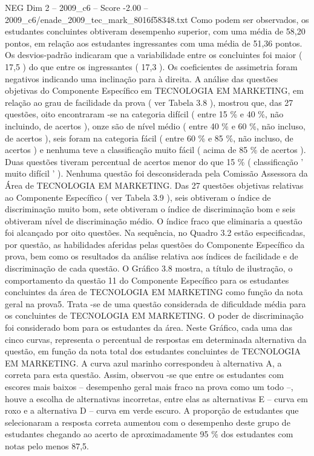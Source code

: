 \begin{textsample}{NEG Dim 2 – 2009\_c6 – Score -2.00 – 2009\_c6/enade\_2009\_tec\_mark\_8016f58348.txt}
Como podem ser observados, os estudantes concluintes obtiveram desempenho superior, com uma média de 58,20 pontos, em relação aos estudantes ingressantes com uma média de 51,36 pontos.
Os desvios-padrão indicaram que a variabilidade entre os concluintes foi maior ( 17,5 ) do que entre os ingressantes ( 17,3 ).
Os coeficientes de assimetria foram negativos indicando uma inclinação para à direita.
A análise das questões objetivas do Componente Específico em TECNOLOGIA EM MARKETING, em relação ao grau de facilidade da prova ( ver Tabela 3.8 ), mostrou que, das 27 questões, oito encontraram -se na categoria difícil ( entre 15 \% e 40 \%, não incluindo, de acertos ), onze são de nível médio ( entre 40 \% e 60 \%, não incluso, de acertos ), seis foram na categoria fácil ( entre 60 \% e 85 \%, não incluso, de acertos ) e nenhuma teve a classificação muito fácil ( acima de 85 \% de acertos ).
Duas questões tiveram percentual de acertos menor do que 15 \% ( classificação ' muito difícil ' ).
Nenhuma questão foi desconsiderada pela Comissão Assessora da Área de TECNOLOGIA EM MARKETING.
Das 27 questões objetivas relativas ao Componente Específico ( ver Tabela 3.9 ), seis obtiveram o índice de discriminação muito bom, sete obtiveram o índice de discriminação bom e seis obtiveram nível de discriminação médio.
O índice fraco que eliminaria a questão foi alcançado por oito questões.
Na sequência, no Quadro 3.2 estão especificadas, por questão, as habilidades aferidas pelas questões do Componente Específico da prova, bem como os resultados da análise relativa aos índices de facilidade e de discriminação de cada questão.
O Gráfico 3.8 mostra, a título de ilustração, o comportamento da questão 11 do Componente Específico para os estudantes concluintes da área de TECNOLOGIA EM MARKETING como função da nota geral na prova5.
Trata -se de uma questão considerada de dificuldade média para os concluintes de TECNOLOGIA EM MARKETING.
O poder de discriminação foi considerado bom para os estudantes da área.
Neste Gráfico, cada uma das cinco curvas, representa o percentual de respostas em determinada alternativa da questão, em função da nota total dos estudantes concluintes de TECNOLOGIA EM MARKETING.
A curva azul marinho correspondeu à alternativa A, a correta para esta questão.
Assim, observou -se que entre os estudantes com escores mais baixos – desempenho geral mais fraco na prova como um todo –, houve a escolha de alternativas incorretas, entre elas as alternativas E – curva em roxo e a alternativa D – curva em verde escuro.
A proporção de estudantes que selecionaram a resposta correta aumentou com o desempenho deste grupo de estudantes chegando ao acerto de aproximadamente 95 \% dos estudantes com notas pelo menos 87,5.

\end{textsample}
